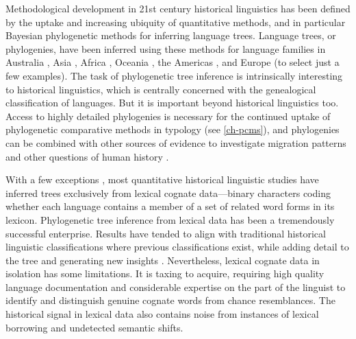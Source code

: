 Methodological development in 21st century historical linguistics has been defined by the uptake and increasing ubiquity of quantitative methods, and in particular Bayesian phylogenetic methods for inferring language trees. Language trees, or phylogenies, have been inferred using these methods for language families in Australia \autocite[Pama-Nyungan:][]{bowern_computational_2012}, Asia \autocites[Aslian:][]{dunn_aslian_2011}[Dravidian:][]{kolipakam_bayesian_2018}, Africa \autocite[Bantu:][]{whiteley_revising_2019}, Oceania \autocite[Austronesian:][]{gray_language_2009}, the Americas \autocites[Chapacuran:][]{birchall_combined_2016}[Tupí-Guaraní:][]{michael_bayesian_2015}, and Europe \autocites[Indo-European:][]{gray_language-tree_2003}{chang_ancestry-constrained_2015} (to select just a few examples). The task of phylogenetic tree inference is intrinsically interesting to historical linguistics, which is centrally concerned with the genealogical classification of languages. But it is important beyond historical linguistics too. Access to highly detailed phylogenies is necessary for the continued uptake of phylogenetic comparative methods in typology (see \ref{ch-pcms}), and phylogenies can be combined with other sources of evidence to investigate migration patterns and other questions of human history \autocites[e.g.][]{hunley_genetic_2008}{bouckaert_mapping_2012}{malaspinas_genomic_2016}{bouckaert_origin_2018}.

With a few exceptions \autocites[e.g.][]{dunn_structural_2005}{dunn_structural_2008}, most quantitative historical linguistic studies have inferred trees exclusively from lexical cognate data---binary characters coding whether each language contains a member of a set of related word forms in its lexicon. Phylogenetic tree inference from lexical data has been a tremendously successful enterprise. Results have tended to align with traditional historical linguistic classifications where previous classifications exist, while adding detail to the tree and generating new insights \autocite[for example, the identification of major divisions within the Pama-Nyungan family, linking smaller, previously-identified subgroups, based on early phylogenetic splits inferred by][]{bowern_computational_2012}. Nevertheless, lexical cognate data in isolation has some limitations. It is taxing to acquire, requiring high quality language documentation and considerable expertise on the part of the linguist to identify and distinguish genuine cognate words from chance resemblances. The historical signal in lexical data also contains noise from instances of lexical borrowing and undetected semantic shifts.

